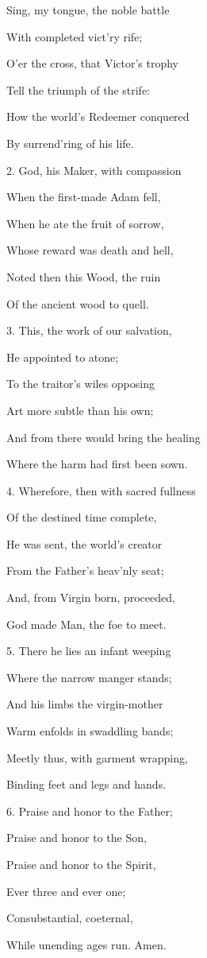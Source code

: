 Sing, my tongue, the noble battle

\noindent With completed vict'ry rife;

\noindent O'er the cross, that Victor's trophy

\noindent Tell the triumph of the strife:

\noindent How the world's Redeemer conquered

\noindent By surrend'ring of his life.

\noindent 

2. God, his Maker, with compassion

\noindent When the first-made Adam fell,

\noindent When he ate the fruit of sorrow,

\noindent Whose reward was death and hell,

\noindent Noted then this Wood, the ruin

\noindent Of the ancient wood to quell.

\noindent 

3. This, the work of our salvation,

\noindent He appointed to atone;

\noindent To the traitor's wiles opposing

\noindent Art more subtle than his own;

\noindent And from there would bring the healing

\noindent Where the harm had first been sown.

\noindent 

4. Wherefore, then with sacred fullness

\noindent Of the destined time complete,

\noindent He was sent, the world's creator

\noindent From the Father's heav'nly seat;

\noindent And, from Virgin born, proceeded,

\noindent God made Man, the foe to meet.

\noindent 

5. There he lies an infant weeping

\noindent Where the narrow manger stands;

\noindent And his limbs the virgin-mother

\noindent Warm enfolds in swaddling bands;

\noindent Meetly thus, with garment wrapping,

\noindent Binding feet and legs and hands.

\noindent 

6. Praise and honor to the Father;

\noindent Praise and honor to the Son,

\noindent Praise and honor to the Spirit,

\noindent Ever three and ever one;

\noindent Consubstantial, coeternal,

\noindent While unending ages run. Amen.